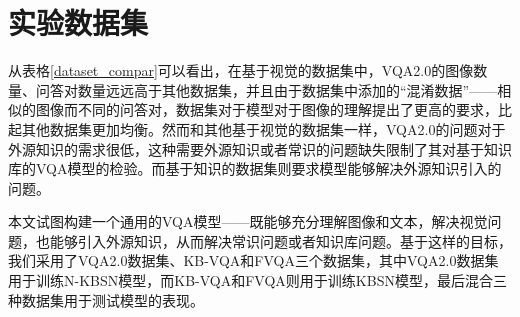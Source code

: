 \section{实验数据集}
从表格\ref{dataset_compar}可以看出，在基于视觉的数据集中，VQA2.0的图像数量、问答对数量远远高于其他数据集，并且由于数据集中添加的“混淆数据”——相似的图像而不同的问答对，数据集对于模型对于图像的理解提出了更高的要求，比起其他数据集更加均衡。然而和其他基于视觉的数据集一样，VQA2.0的问题对于外源知识的需求很低，这种需要外源知识或者常识的问题缺失限制了其对基于知识库的VQA模型的检验。而基于知识的数据集则要求模型能够解决外源知识引入的问题。

本文试图构建一个通用的VQA模型——既能够充分理解图像和文本，解决视觉问题，也能够引入外源知识，从而解决常识问题或者知识库问题。基于这样的目标，我们采用了VQA2.0数据集、KB-VQA和FVQA三个数据集，其中VQA2.0数据集用于训练N-KBSN模型，而KB-VQA和FVQA则用于训练KBSN模型，最后混合三种数据集用于测试模型的表现。
